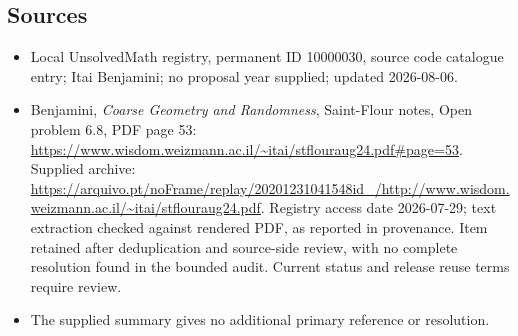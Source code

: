 \documentclass[11pt]{article}
\begin{document}
\subsection{Sources}
\begin{itemize}
\item Local UnsolvedMath registry, permanent ID 10000030, source code catalogue entry; Itai Benjamini; no proposal year supplied; updated 2026-08-06.
\item Benjamini, \emph{Coarse Geometry and Randomness}, Saint-Flour notes, Open problem 6.8, PDF page 53: \url{https://www.wisdom.weizmann.ac.il/~itai/stflouraug24.pdf#page=53}. Supplied archive: \url{https://arquivo.pt/noFrame/replay/20201231041548id_/http://www.wisdom.weizmann.ac.il/~itai/stflouraug24.pdf}. Registry access date 2026-07-29; text extraction checked against rendered PDF, as reported in provenance. Item retained after deduplication and source-side review, with no complete resolution found in the bounded audit. Current status and release reuse terms require review.
\item The supplied summary gives no additional primary reference or resolution.
\end{itemize}
\end{document}
